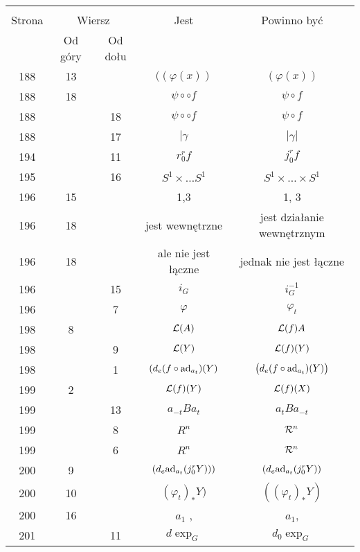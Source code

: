 \documentclass[a4paper,11pt]{article}
\begin{document}
\begin{center}
  \begin{tabular}{|c|c|c|c|c|}
    \hline
    & \multicolumn{2}{c|}{} & & \\
    Strona & \multicolumn{2}{c|}{Wiersz} & Jest
                              & Powinno być \\ \cline{2-3}
    & Od góry & Od dołu & & \\
    \hline
    188 & 13 & & $( ( \varphi( x ) )$ & $( \varphi( x ) )$ \\
    188 & 18 & & $\psi \circ \circ f$ & $\psi \circ f$ \\
    188 & & 18 & $\psi \circ \circ f$ & $\psi \circ f$ \\
    188 & & 17 & $| \gamma$ & $| \gamma |$ \\
    194 & & 11 & $r^{ r }_{ 0 } f$ & $j^{ r }_{ 0 } f$ \\
    195 & & 16 & $S^{ 1 } \times \ldots S^{ 1 }$ & $S^{ 1 } \times \ldots \times S^{ 1 }$ \\
    196 & 15 & & 1,3 & 1, 3 \\
    196 & 18 & & jest wewnętrzne & jest działanie wewnętrznym \\
    196 & 18 & & ale nie jest łączne & jednak nie jest łączne \\
    196 & & 15 & $i_{ G }$ & $i_{ G }^{ -1 }$ \\
    196 & &  7 & $\varphi$ & $\varphi_{ t }$ \\
    198 &  8 & & $\mathcal{L}( A )$ & $\mathcal{L}( f )A$ \\
    198 & &  9 & $\mathcal{L}( Y )$ & $\mathcal{L}( f )( Y )$ \\
    198 & &  1 & $( d_{ e }( f \circ \mathrm{ad}_{ a_{ t } } )( Y )$
           & $\big( d_{ e }( f \circ \mathrm{ad}_{ a_{ t } } )( Y ) \big)$ \\
    199 & 2 & & $\mathcal{L}( f )( Y )$ & $\mathcal{L}( f )( X )$ \\
    199 & & 13 & $a_{ -t } B a_{ t }$ & $a_{ t } B a_{ -t }$ \\
    199 & &  8 & $R^{ n }$ & $\mathcal{R}^{ n }$ \\
    199 & &  6 & $R^{ n }$ & $\mathcal{R}^{ n }$ \\
    200 & 9 & & $( d_{ e }\mathrm{ad}_{ a_{ t } }( j^{ r }_{ 0 } Y ) ) )$
           & $( d_{ e }\mathrm{ad}_{ a_{ t } }( j^{ r }_{ 0 } Y ) )$ \\
    200 & 10 & & $( \varphi_{ t } )_{ * } Y )$
           & $( ( \varphi_{ t } )_{ * } Y )$ \\
    200 & 16 & & $a_{ 1 }$ , & $a_{ 1 }$, \\
    201 & & 11 & $d \exp_{ G }$ & $d_{ 0 } \exp_{ G }$ \\

\end{tabular}
\end{center}
\end{document}
